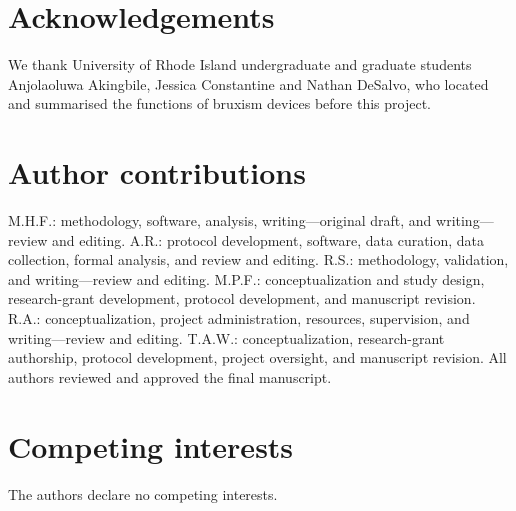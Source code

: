 \documentclass[pdflatex,sn-nature,iicol]{sn-jnl}
\begin{document}
\section*{Acknowledgements}
We thank University of Rhode Island undergraduate and graduate students Anjolaoluwa Akingbile, Jessica Constantine and Nathan DeSalvo, who located and summarised the functions of bruxism devices before this project.

\section*{Author contributions}
M.H.F.: methodology, software, analysis, writing---original draft, and writing---review and editing. A.R.: protocol development, software, data curation, data collection, formal analysis, and review and editing. R.S.: methodology, validation, and writing---review and editing. M.P.F.: conceptualization and study design, research-grant development, protocol development, and manuscript revision. R.A.: conceptualization, project administration, resources, supervision, and writing---review and editing. T.A.W.: conceptualization, research-grant authorship, protocol development, project oversight, and manuscript revision. All authors reviewed and approved the final manuscript.

\section*{Competing interests}
The authors declare no competing interests.


\end{document}
